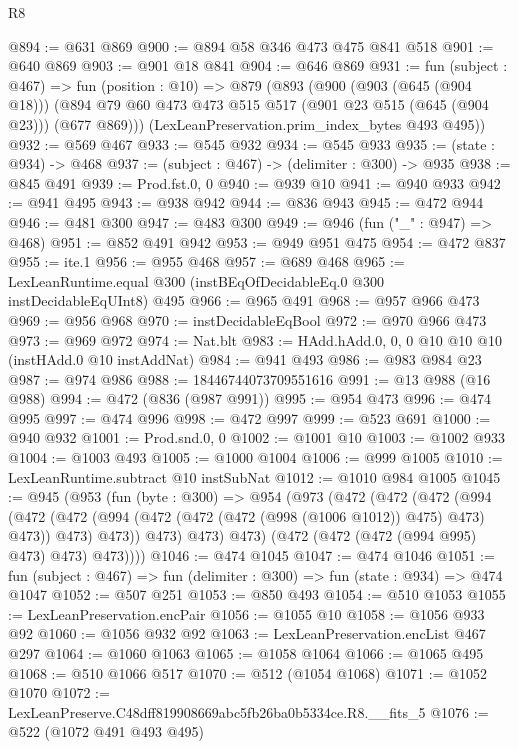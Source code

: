 \begin{lexlean}{R8}
\begin{coremodule}
@894 := @631 @869
@900 := @894 @58 @346 @473 @475 @841 @518
@901 := @640 @869
@903 := @901 @18 @841
@904 := @646 @869
@931 := fun (subject : @467) =>
  fun (position : @10) =>
  @879
    (@893
      (@900
        (@903 (@645 (@904 @18)))
        (@894 @79 @60 @473 @473 @515 @517 (@901 @23 @515 (@645 (@904 @23))) (@677 @869)))
      (LexLeanPreservation.prim_index_bytes @493 @495))
@932 := @569 @467
@933 := @545 @932
@934 := @545 @933
@935 := (state : @934) -> @468
@937 := (subject : @467) -> (delimiter : @300) -> @935
@938 := @845 @491
@939 := Prod.fst.{0, 0}
@940 := @939 @10
@941 := @940 @933
@942 := @941 @495
@943 := @938 @942
@944 := @836 @943
@945 := @472 @944
@946 := @481 @300
@947 := @483 @300
@949 := @946 (fun ("_" : @947) => @468)
@951 := @852 @491 @942
@953 := @949 @951 @475
@954 := @472 @837
@955 := ite.{1}
@956 := @955 @468
@957 := @689 @468
@965 := LexLeanRuntime.equal @300 (instBEqOfDecidableEq.{0} @300 instDecidableEqUInt8) @495
@966 := @965 @491
@968 := @957 @966 @473
@969 := @956 @968
@970 := instDecidableEqBool
@972 := @970 @966 @473
@973 := @969 @972
@974 := Nat.blt
@983 := HAdd.hAdd.{0, 0, 0} @10 @10 @10 (instHAdd.{0} @10 instAddNat)
@984 := @941 @493
@986 := @983 @984 @23
@987 := @974 @986
@988 := 18446744073709551616
@991 := @13 @988 (@16 @988)
@994 := @472 (@836 (@987 @991))
@995 := @954 @473
@996 := @474 @995
@997 := @474 @996
@998 := @472 @997
@999 := @523 @691
@1000 := @940 @932
@1001 := Prod.snd.{0, 0}
@1002 := @1001 @10
@1003 := @1002 @933
@1004 := @1003 @493
@1005 := @1000 @1004
@1006 := @999 @1005
@1010 := LexLeanRuntime.subtract @10 instSubNat
@1012 := @1010 @984 @1005
@1045 := @945
    (@953
      (fun (byte : @300) =>
      @954
        (@973
          (@472
            (@472
              (@472
                (@994
                  (@472
                    (@472 (@994 (@472 (@472 (@472 (@998 (@1006 @1012)) @475) @473) @473)) @473)
                    @473))
                @473)
              @473)
            @473)
          (@472 (@472 (@472 (@994 @995) @473) @473) @473))))
@1046 := @474 @1045
@1047 := @474 @1046
@1051 := fun (subject : @467) => fun (delimiter : @300) => fun (state : @934) => @474 @1047
@1052 := @507 @251
@1053 := @850 @493
@1054 := @510 @1053
@1055 := LexLeanPreservation.encPair
@1056 := @1055 @10
@1058 := @1056 @933 @92
@1060 := @1056 @932 @92
@1063 := LexLeanPreservation.encList @467 @297
@1064 := @1060 @1063
@1065 := @1058 @1064
@1066 := @1065 @495
@1068 := @510 @1066 @517
@1070 := @512 (@1054 @1068)
@1071 := @1052 @1070
@1072 := LexLeanPreserve.C48dff819908669abc5fb26ba0b5334ce.R8.__fits_5
@1076 := @522 (@1072 @491 @493 @495)

\end{coremodule}
\end{lexlean}
